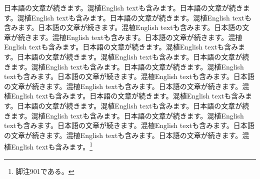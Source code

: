 \documentclass[pdflatex,book]{jlreq}
\begin{document}
日本語の文章が続きます。混植English textも含みます。日本語の文章が続きます。混植English textも含みます。日本語の文章が続きます。混植English textも含みます。日本語の文章が続きます。混植English textも含みます。日本語の文章が続きます。混植English textも含みます。日本語の文章が続きます。混植English textも含みます。日本語の文章が続きます。混植English textも含みます。日本語の文章が続きます。混植English textも含みます。日本語の文章が続きます。混植English textも含みます。日本語の文章が続きます。混植English textも含みます。日本語の文章が続きます。混植English textも含みます。日本語の文章が続きます。混植English textも含みます。日本語の文章が続きます。混植English textも含みます。日本語の文章が続きます。混植English textも含みます。日本語の文章が続きます。混植English textも含みます。日本語の文章が続きます。混植English textも含みます。日本語の文章が続きます。混植English textも含みます。日本語の文章が続きます。混植English textも含みます。日本語の文章が続きます。混植English textも含みます。日本語の文章が続きます。混植English textも含みます。\footnote{脚注901である。}
\end{document}
